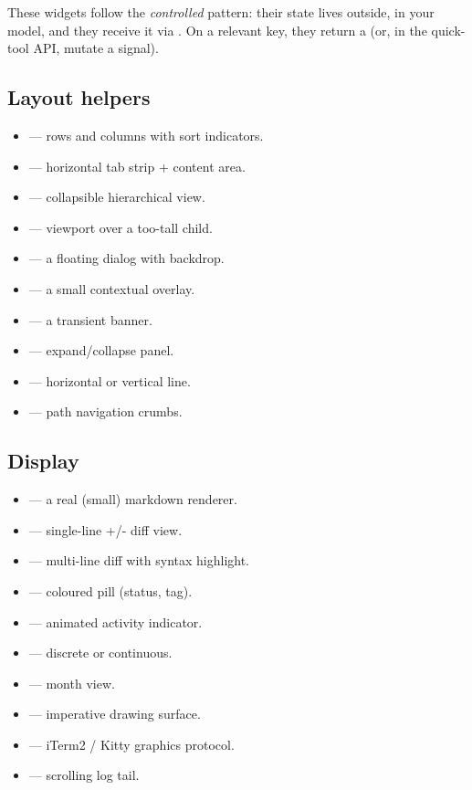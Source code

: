 These widgets follow the \emph{controlled} pattern: their state
lives outside, in your model, and they receive it via .
On a relevant key, they return a  (or, in the quick-tool
API, mutate a signal).

\subsection{Layout helpers}

\begin{itemize}[leftmargin=*]
  \item {} --- rows and columns with sort indicators.
  \item {} --- horizontal tab strip + content area.
  \item {} --- collapsible hierarchical view.
  \item {} --- viewport over a too-tall child.
  \item {} --- a floating dialog with backdrop.
  \item {} --- a small contextual overlay.
  \item {} --- a transient banner.
  \item {} --- expand/collapse panel.
  \item {} --- horizontal or vertical line.
  \item {} --- path navigation crumbs.
\end{itemize}

\subsection{Display}

\begin{itemize}[leftmargin=*]
  \item {} --- a real (small) markdown renderer.
  \item {} --- single-line +/- diff view.
  \item {} --- multi-line diff with syntax highlight.
  \item {} --- coloured pill (status, tag).
  \item {} --- animated activity indicator.
  \item {} --- discrete or continuous.
  \item {} --- month view.
  \item {} --- imperative drawing surface.
  \item {} --- iTerm2 / Kitty graphics protocol.
  \item {} --- scrolling log tail.
\end{itemize}

